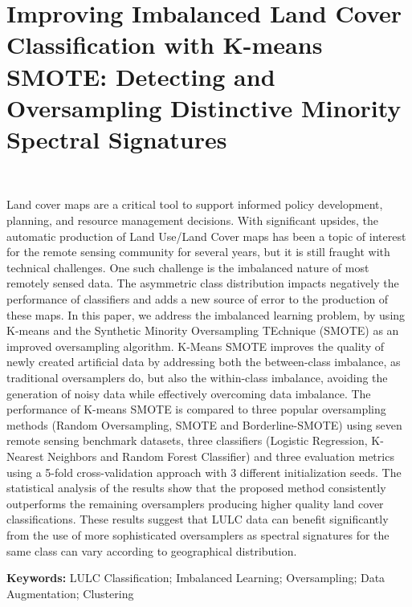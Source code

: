 \chapter{%
    Improving Imbalanced Land Cover Classification with K-means SMOTE\@:
    Detecting and Oversampling Distinctive Minority Spectral Signatures
}~\label{chp:kmeans-smote}


\graphicspath{{figures/kmeans-smote-lulc/}}

\begin{adjustwidth}{30pt}{30pt}

    Land cover maps are a critical tool to support informed policy
    development, planning, and resource management decisions. With significant
    upsides, the automatic production of Land Use/Land Cover maps has been a
    topic of interest for the remote sensing community for several years, but
    it is still fraught with technical challenges. One such challenge is the
    imbalanced nature of most remotely sensed data. The asymmetric class
    distribution impacts negatively the performance of classifiers and adds a
    new source of error to the production of these maps. In this paper, we
    address the imbalanced learning problem, by using K-means and the
    Synthetic Minority Oversampling TEchnique (SMOTE) as an improved
    oversampling algorithm.  K-Means SMOTE improves the quality of newly
    created artificial data by addressing both the between-class imbalance, as
    traditional oversamplers do, but also the within-class imbalance, avoiding
    the generation of noisy data while effectively overcoming data imbalance.
    The performance of K-means SMOTE is compared to three popular oversampling
    methods (Random Oversampling, SMOTE and Borderline-SMOTE) using seven
    remote sensing benchmark datasets, three classifiers (Logistic Regression,
    K-Nearest Neighbors and Random Forest Classifier) and three evaluation
    metrics using a 5-fold cross-validation approach with 3 different
    initialization seeds. The statistical analysis of the results show that
    the proposed method consistently outperforms the remaining oversamplers
    producing higher quality land cover classifications. These results suggest
    that LULC data can benefit significantly from the use of more
    sophisticated oversamplers as spectral signatures for the same class can
    vary according to geographical distribution.

\end{adjustwidth}

\vspace{.5cm}
\textbf{Keywords:} LULC Classification; Imbalanced Learning; Oversampling;
Data Augmentation; Clustering

